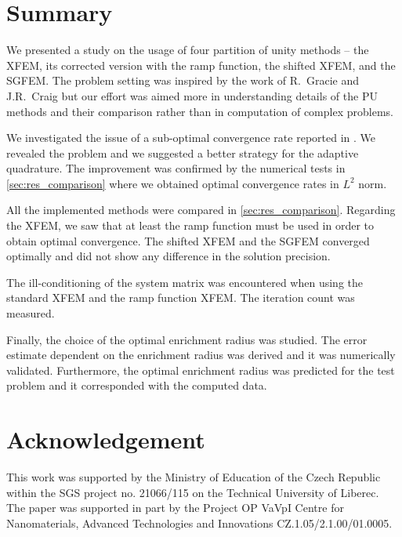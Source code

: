 \documentclass{elsarticle}
\begin{document}
\section{Summary}
\label{sec:summary}

We presented a study on the usage of four partition of unity methods -- the XFEM, its corrected version with the ramp 
function, the shifted XFEM, and the SGFEM. The problem setting was inspired by the work \cite{gracie_modelling_2010,craig_using_2011} 
of R.~Gracie and J.R.~Craig but our effort was aimed more in understanding details of the PU methods and their comparison
rather than in computation of complex problems.

We investigated the issue of a sub-optimal convergence rate reported in \cite{gracie_modelling_2010}. We revealed the problem
and we suggested a better strategy for the adaptive quadrature. The improvement was confirmed by the numerical
tests in \ref{sec:res_comparison} where we obtained optimal convergence rates in $L^2$ norm.

All the implemented methods were compared in \ref{sec:res_comparison}. Regarding the XFEM, we saw that at 
least the ramp function must be used in order to obtain optimal convergence. The shifted XFEM and 
the SGFEM converged optimally and did not show any difference in the solution precision.

The ill-conditioning of the system matrix was encountered when using the standard XFEM and the ramp function XFEM.
The iteration count was measured.

Finally, the choice of the optimal enrichment radius was studied. The error estimate dependent on the enrichment
radius was derived and it was numerically validated. Furthermore, the optimal enrichment radius was predicted 
for the test problem and it corresponded with the computed data.

\section{Acknowledgement}
This work was supported by the Ministry of Education of the Czech Republic within the SGS project 
no. 21066/115 on the Technical University of Liberec. The paper was supported in part by the Project OP
VaVpI Centre for Nanomaterials, Advanced Technologies  and Innovations
CZ.1.05/2.1.00/01.0005.


\end{document}
